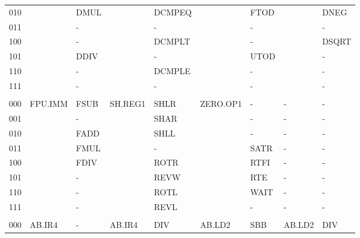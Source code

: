 \begin{table}
\begin{center}
\begin{tabular}{l|ll|ll|ll|ll}
010  &            & DMUL     &           & DCMPEQ          &            & FTOD            &            & DNEG      \\
011  &            & -        &           & -               &            & -               &            & -         \\
100  &            & -        &           & DCMPLT          &            & -               &            & DSQRT     \\
101  &            & DDIV     &           & -               &            & UTOD            &            & -         \\
110  &            & -        &           & DCMPLE          &            & -               &            & -         \\
111  &            & -        &           & -               &            & -               &            & -         \\
     &            &          &           &                 &            &                 &            &           \\
000  & FPU.IMM    & FSUB     & SH.REG1   & SHLR            & ZERO.OP1   & -               & -          & -         \\
001  &            & -        &           & SHAR            &            & -               & -          & -         \\
010  &            & FADD     &           & SHLL            &            & -               & -          & -         \\
011  &            & FMUL     &           & -               &            & SATR            & -          & -         \\
100  &            & FDIV     &           & ROTR            &            & RTFI            & -          & -         \\
101  &            & -        &           & REVW            &            & RTE             & -          & -         \\
110  &            & -        &           & ROTL            &            & WAIT            & -          & -         \\
111  &            & -        &           & REVL            &            & -               & -          & -         \\
     &            &          &           &                 &            &                 &            &           \\
000  & AB.IR4     & -        & AB.IR4    & DIV             & AB.LD2     & SBB             & AB.LD2     & DIV       \\

\end{tabular}
\end{center}
\end{table}

